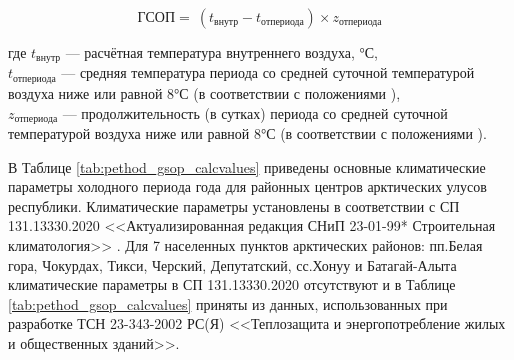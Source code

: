 
\begin{eqndesc}
    \begin{equation}\label{eq:gsop}
        \text{ГСОП}=\ (t_{\text{внутр}}-t_{\text{отпериода}})\times z_{\text{отпериода}}
    \end{equation}

    где $t_{\text{внутр}}$ — расчётная температура внутреннего воздуха, °С,\\
    $t_{\text{отпериода}}$ — средняя температура периода со средней суточной температурой воздуха ниже или равной 8°С (в соответствии с положениями \cite{law_RU_RulesCode_BuildingClimatology}),\\
    $z_{\text{отпериода}}$ — продолжительность (в сутках) периода со средней суточной температурой воздуха ниже или равной 8°С (в соответствии с положениями \cite{law_RU_RulesCode_BuildingClimatology}).
\end{eqndesc}



В Таблице \ref{tab:pethod_gsop_calcvalues} приведены основные климатические параметры холодного периода года для районных центров арктических улусов республики.
Климатические параметры установлены в соответствии с СП 131.13330.2020 <<Актуализированная редакция СНиП 23-01-99* Строительная климатология>> \Code{[19]}.
Для 7 населенных пунктов арктических районов: пп.Белая гора, Чокурдах, Тикси, Черский, Депутатский,
сс.Хонуу и Батагай-Алыта климатические параметры в СП 131.13330.2020 \Code{[19]} отсутствуют и в Таблице \ref{tab:pethod_gsop_calcvalues} приняты из данных,
использованных при разработке ТСН 23-343-2002 РС(Я) <<Теплозащита и энергопотребление жилых и общественных зданий>>.

